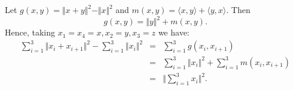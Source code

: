 \documentclass[12pt]{article}
\begin{document}
Let $g(x,y) = \Vert x + y \Vert^2 - \Vert x \Vert^2$ and $m(x,y) = \langle x, y \rangle + \langle y , x \rangle $.
Then
$$
g(x,y) = \Vert y \Vert^2 + m(x,y).
$$
Hence, taking $x_1 = x_4 = x, x_2 = y, x_3 = z$ we have:
\begin{eqnarray*}
\sum_{i=1}^3 \Vert x_i + x_{i+1} \Vert^2 - \sum_{i=1}^3 \Vert x_i \Vert^2 & = & \sum_{i=1}^3 g(x_i , x_{i+1} ) \\
& =& \sum_{i=1}^3\Vert x_i \Vert^2 + \sum_{i=1}^3 m(x_i, x_{i+1} ) \\ 
& = & \Big\Vert \sum_{i=1}^3 x_i \Big\Vert^2.
\end{eqnarray*}
\end{document}
